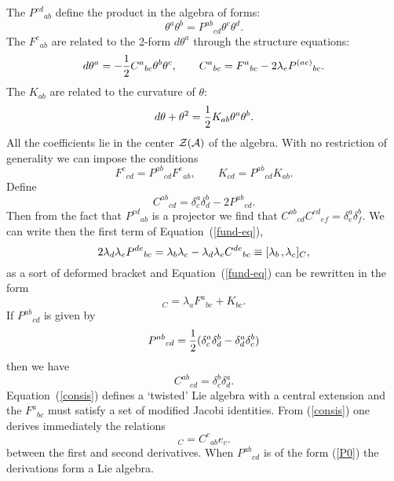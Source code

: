 \documentclass[a4paper,12pt]{article}
\def\c#1{{\cal #1}}
\def\k{\kern-.1em\mathbin{,}\kern-.1em}
\begin{document}
The $P^{cd}{}_{ab}$ define the product in the algebra of forms:
\begin{equation}
\theta^a \theta^b = P^{ab}{}_{cd} \theta^c \theta^d.            \label{struc}
\end{equation}
The $F^c{}_{ab}$ are related to the 2-form $d\theta^a$ through the
structure equations:
\begin{equation}
d\theta^a = - {1\over 2}C^a{}_{bc} \theta^b \theta^c, \qquad
C^a{}_{bc} = F^a{}_{bc} - 2 \lambda_e P^{(ae)}{}_{bc}.           \label{s-e}
\end{equation}
The $K_{ab}$ are related to the curvature of $\theta$:
$$
d\theta + \theta^2 = {1\over 2} K_{ab} \theta^a \theta^b.
$$
All the coefficients lie in the center $\c{Z}(\c{A})$ of the
algebra.  With no restriction of generality we can impose the
conditions
\begin{equation}
F^e{}_{cd} = P^{ab}{}_{cd} F^e{}_{ab}, \qquad K_{cd} = 
P^{ab}{}_{cd} K_{ab}.                                           \label{F-P-K}
\end{equation}
Define
$$
C^{ab}{}_{cd} = \delta^a_c \delta^b_d - 2 P^{ab}{}_{cd}.       %
$$
Then from the fact that $P^{cd}{}_{ab}$ is a projector we find that
$C^{ab}{}_{cd}C^{cd}{}_{ef} = \delta^a_e \delta^b_f$.  We can write
then the first term of Equation~(\ref{fund-eq}),
$$
2 \lambda_d \lambda_e P^{de}{}_{bc} = \lambda_b \lambda_c -
\lambda_d \lambda_e C^{de}{}_{bc} \equiv
[\lambda_b\k \lambda_c]_C,                                       %
$$
as a sort of deformed bracket and Equation~(\ref{fund-eq}) can be
rewritten in the form
\begin{equation}
[\lambda_b\k \lambda_c]_C = \lambda_a F^a{}_{bc} + K_{bc}.
\label{consis}
\end{equation}
If $P^{ab}{}_{cd}$ is given by
\begin{equation}
P^{ab}{}_{cd} = {1 \over 2} (\delta^a_c \delta^b_d - \delta^a_d
\delta^b_c) \label{P0}
\end{equation}
then we have
$$
C^{ab}{}_{cd} = \delta^b_c \delta^a_d.                          %
$$
Equation~(\ref{consis}) defines a `twisted' Lie algebra with a
central extension and the $F^a{}_{bc}$ must satisfy a set of modified
Jacobi identities.  From (\ref{consis}) one derives immediately the
relations
\begin{equation}
[e_a\k e_b]_C = C^c{}_{ab} e_c.  \label{Lie}
\end{equation}
between the first and second derivatives. When $P^{ab}{}_{cd}$ is of
the form (\ref{P0}) the derivations form a Lie algebra.
\end{document}
